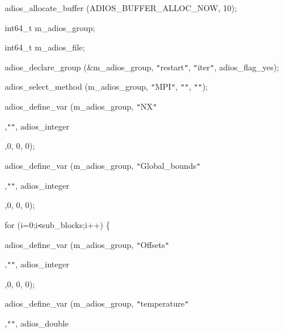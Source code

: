 \vspace{10pt}
adios\_allocate\_buffer (ADIOS\_BUFFER\_ALLOC\_NOW, 10);

\vspace{23pt}
\parindent=57pt
int64\_t       m\_adios\_group;

\vspace{10pt}
\parindent=28pt
int64\_t       m\_adios\_file;

\vspace{23pt}
adios\_declare\_group (\&m\_adios\_group, \texttt{"}restart\texttt{"}, \texttt{"}iter\texttt{"}, 
adios\_flag\_yes);

\vspace{10pt}
\parindent=57pt
adios\_select\_method (m\_adios\_group, \texttt{"}MPI\texttt{"}, \texttt{"}\texttt{"}, 
\texttt{"}\texttt{"});

\vspace{10pt}
\parindent=28pt
adios\_define\_var (m\_adios\_group, \texttt{"}NX\texttt{"}

\vspace{10pt}
\parindent=86pt
,\texttt{"}\texttt{"}, adios\_integer

\vspace{10pt}
,0, 0, 0);

\vspace{23pt}
\parindent=115pt
adios\_define\_var (m\_adios\_group, \texttt{"}Global\_bounds\texttt{"}

\vspace{10pt}
\parindent=86pt
,\texttt{"}\texttt{"}, adios\_integer

\vspace{10pt}
,0, 0, 0);

\vspace{23pt}
\parindent=115pt
for (i=0;i\texttt{<}sub\_blocks;i++) \{

\vspace{23pt}
\parindent=39pt
adios\_define\_var (m\_adios\_group, \texttt{"}Offsets\texttt{"}

\vspace{10pt}
\parindent=86pt
,\texttt{"}\texttt{"}, adios\_integer

\vspace{10pt}
,0, 0, 0);

\vspace{23pt}
\parindent=126pt
adios\_define\_var (m\_adios\_group, \texttt{"}temperature\texttt{"}

\vspace{10pt}
\parindent=86pt
,\texttt{"}\texttt{"}, adios\_double

